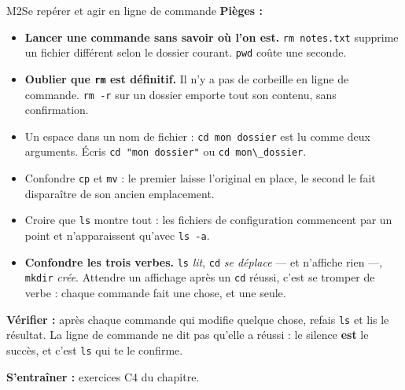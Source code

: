 \begin{fichemethode}{M2}{Se repérer et agir en ligne de commande}
\textbf{Pièges :}
\begin{itemize}
  \item \textbf{Lancer une commande sans savoir où l'on est.} \lstinline{rm notes.txt}
    supprime un fichier différent selon le dossier courant. \lstinline{pwd} coûte une
    seconde.
  \item \textbf{Oublier que \lstinline{rm} est définitif.} Il n'y a pas de corbeille en
    ligne de commande. \lstinline{rm -r} sur un dossier emporte tout son contenu, sans
    confirmation.
  \item Un espace dans un nom de fichier : \lstinline{cd mon dossier} est lu comme deux
    arguments. Écris \lstinline{cd "mon dossier"} ou \lstinline{cd mon\_dossier}.
  \item Confondre \lstinline{cp} et \lstinline{mv} : le premier laisse l'original en place,
    le second le fait disparaître de son ancien emplacement.
  \item Croire que \lstinline{ls} montre tout : les fichiers de configuration commencent
    par un point et n'apparaissent qu'avec \lstinline{ls -a}.
  \item \textbf{Confondre les trois verbes.} \lstinline{ls} \emph{lit},
    \lstinline{cd} \emph{se déplace} — et n'affiche rien —, \lstinline{mkdir} \emph{crée}.
    Attendre un affichage après un \lstinline{cd} réussi, c'est se tromper de verbe : chaque
    commande fait une chose, et une seule.
\end{itemize}

\textbf{Vérifier :} après chaque commande qui modifie quelque chose, refais \lstinline{ls}
et lis le résultat. La ligne de commande ne dit pas qu'elle a réussi : le silence
\textbf{est} le succès, et c'est \lstinline{ls} qui te le confirme.

\textbf{S'entraîner :} exercices C4 du chapitre.
\end{fichemethode}
